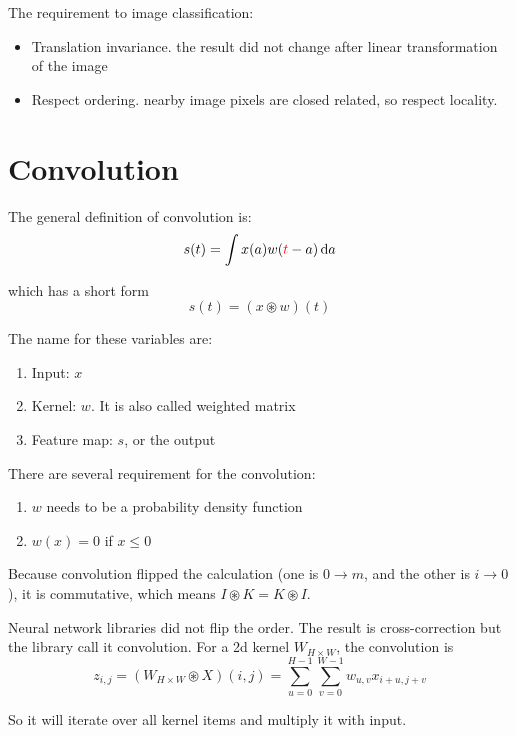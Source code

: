 The requirement to image classification:
\begin{itemize}
    \item Translation invariance. the result did not change after linear transformation of the image
    \item Respect ordering. nearby image pixels are closed related, so respect locality.
\end{itemize}


\section{Convolution}

\begin{definition}

The general definition of convolution is:
\begin{equation}
    s(t) = \int x(a) w({\color{red}t}-a) \dif a
\end{equation}

which has a short form
\begin{equation}
    s(t) = (x \circledast w)(t)
\end{equation}

The name for these variables are:
\begin{enumerate}
    \item Input: $x$
    \item Kernel: $w$. It is also called weighted matrix
    \item Feature map: $s$, or the output
\end{enumerate}
    
\end{definition}

There are several requirement for the convolution:
\begin{enumerate}
    \item $w$ needs to be a probability density function
    \item $w(x) = 0$ if $x \leq 0$
\end{enumerate}

Because convolution flipped the calculation (one is $0 \rightarrow m$, and the other is $i \rightarrow 0$), it is commutative, which means $I \circledast K = K \circledast I$.

\begin{definition}
    Neural network libraries did not flip the order. The result is cross-correction but the library call it convolution. For a 2d kernel $W_{H \times W}$, the convolution is
    \begin{equation}
        z_{i,j} = (W_{H \times W} \circledast X) (i,j) = \sum_{u=0}^{H-1} \sum_{v=0}^{W-1} w_{u,v} x_{i+u,j+v}
    \end{equation}
    
    So it will iterate over all kernel items and multiply it with input. 
\end{definition}

